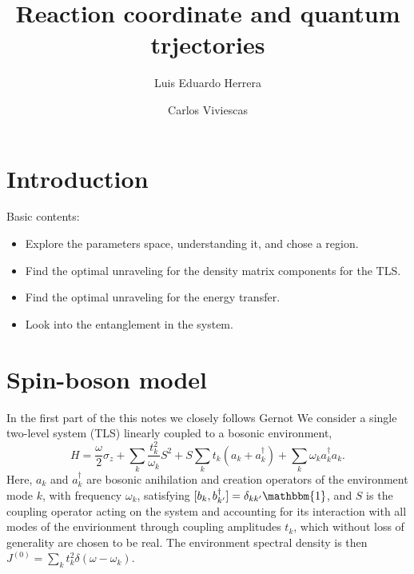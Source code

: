 \documentclass[%
preprint,
onecolumn,
notitlepag,
 amsmath,amssymb,
 aps,
 pra,
]{revtex4-2}
\begin{document}
\title[]{Reaction coordinate and quantum trjectories}
\author{Luis Eduardo Herrera}
\author{Carlos Viviescas}
\begin{abstract}
\end{abstract}
	
\maketitle
%
\section{Introduction}
Basic contents:
\begin{itemize}
\item Explore the parameters space, understanding it, and chose a region.
\item Find the optimal unraveling for the density matrix components for the TLS.
\item Find the optimal unraveling for the energy transfer.
\item Look into the entanglement in the system.
\end{itemize}

\section{Spin-boson model}
In the first part of the this notes we closely follows Gernot 
We consider a single two-level system (TLS) linearly coupled to a bosonic environment, 
\begin{equation}
\label{eq:H_SB}
H = \frac{\omega}{2} \sigma_{z}+\sum_{k} \frac{t_{k}^{2}}{\omega_{k}} S^{2}+S \sum_{k} t_{k}\left(a_{k}+a_{k}^{\dagger}\right)+\sum_{k} \omega_{k} a_{k}^{\dagger} a_{k}.
\end{equation}
Here, $a_{k}$ and $a^{\dagger}_{k}$ are bosonic anihilation and creation operators of the environment mode $k$, with frequency $\omega_{k}$, satisfying $[b_{k},b^{\dagger}_{k'}] = \delta_{kk'} \mathbbm{1}$, and $S$ is the coupling operator acting on the system and accounting for its interaction with all modes of the envirionment through coupling amplitudes $t_{k}$, which without loss of generality are chosen to be real. The environment spectral density is then $J^{(0)} = \sum_{k} t_{k}^2 \delta (\omega -  \omega_{k})$.
\end{document}
